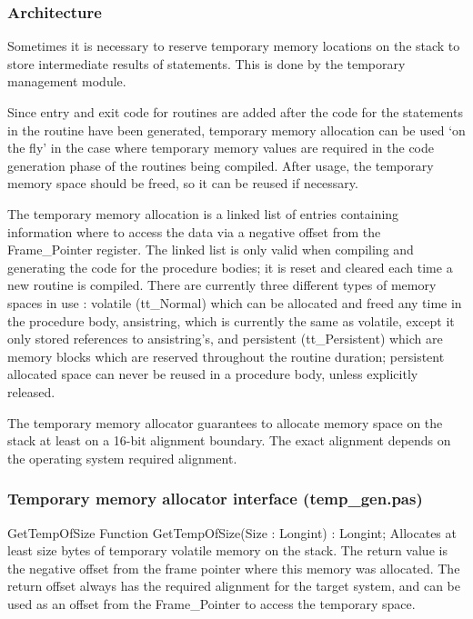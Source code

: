 \documentclass [a4paper,12pt]{article}
\begin{document}
\subsubsection{Architecture}
\label{subsubsec:architecturemory}

Sometimes it is necessary to reserve temporary memory locations on the stack
to store intermediate results of statements. This is done by the temporary
management module.

Since entry and exit code for routines are added after the code for the
statements in the routine have been generated, temporary memory allocation
can be used `on the fly' in the case where temporary memory values are
required in the code generation phase of the routines being compiled. After
usage, the temporary memory space should be freed, so it can be reused if
necessary.

The temporary memory allocation is a linked list of entries containing
information where to access the data via a negative offset from the
Frame{\_}Pointer register. The linked list is only valid when compiling and
generating the code for the procedure bodies; it is reset and cleared each
time a new routine is compiled. There are currently three different types of
memory spaces in use : volatile (\textsf{tt{\_}Normal}) which can be
allocated and freed any time in the procedure body, ansistring, which is
currently the same as volatile, except it only stored references to
ansistring's, and persistent (\textsf{tt{\_}Persistent}) which are memory
blocks which are reserved throughout the routine duration; persistent
allocated space can never be reused in a procedure body, unless explicitly
released.

The temporary memory allocator guarantees to allocate memory space on the
stack at least on a 16-bit alignment boundary. The exact alignment depends
on the operating system required alignment.

\subsubsection{Temporary memory allocator interface (temp{\_}gen.pas)}
\label{subsubsec:temporary}

\begin{function}{GetTempOfSize}
\Declaration
Function GetTempOfSize(Size : Longint) : Longint;
\Description
Allocates at least \textsf{size} bytes of temporary volatile memory on the
stack. The return value is the negative offset from the frame pointer where
this memory was allocated.
\Notes
The return offset always has the required alignment for the target system,
and can be used as an offset from the Frame{\_}Pointer to access the
temporary space.
\end{function}
\end{document}

